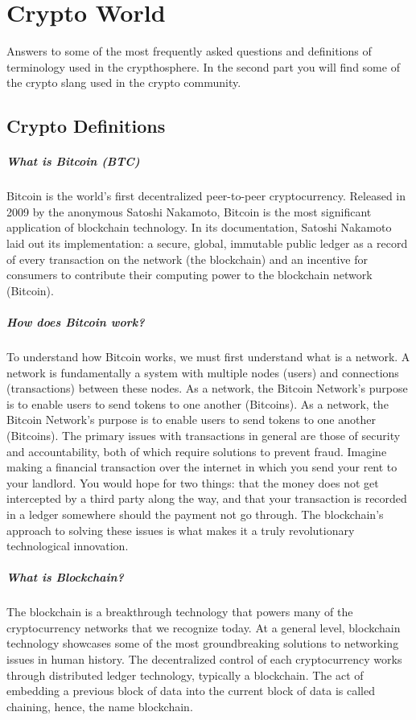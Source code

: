 \chapter{Crypto World}
\label{ch:Crypto Terms}
Answers to some of the most frequently asked questions and definitions of terminology used in the crypthosphere. In the second part you will find some of the crypto slang used in the crypto community.
\medskip
\section{Crypto Definitions}



\paragraph{What is Bitcoin (BTC)} Bitcoin is the world's first decentralized peer-to-peer cryptocurrency. Released in 2009 by the anonymous Satoshi Nakamoto, Bitcoin is the most significant application of blockchain technology. In its documentation, Satoshi Nakamoto laid out its implementation: a secure, global, immutable public ledger as a record of every transaction on the network (the blockchain) and an incentive for consumers to contribute their computing power to the blockchain network (Bitcoin).

\paragraph{How does Bitcoin work?} To understand how Bitcoin works, we must first understand what is a network. A network is fundamentally a system with multiple nodes (users) and connections (transactions) between these nodes. As a network, the Bitcoin Network’s purpose is to enable users to send tokens to one another (Bitcoins). As a network, the Bitcoin Network's purpose is to enable users to send tokens to one another (Bitcoins). The primary issues with transactions in general are those of security and accountability, both of which require solutions to prevent fraud. Imagine making a financial transaction over the internet in which you send your rent to your landlord. You would hope for two things: that the money does not get intercepted by a third party along the way, and that your transaction is recorded in a ledger somewhere should the payment not go through. The blockchain's approach to solving these issues is what makes it a truly revolutionary technological innovation. 

\paragraph{What is Blockchain?} The blockchain is a breakthrough technology that powers many of the cryptocurrency networks that we recognize today. At a general level, blockchain technology showcases some of the most groundbreaking solutions to networking issues in human history. The decentralized control of each cryptocurrency works through distributed ledger technology, typically a blockchain. The act of embedding a previous block of data into the current block of data is called chaining, hence, the name blockchain.

